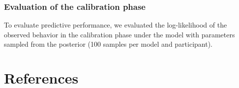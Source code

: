 \documentclass{article}
\begin{document}
\subsubsection{Evaluation of the calibration phase}
To evaluate predictive performance, we evaluated the log-likelihood of the observed behavior in the calibration phase under the model with parameters sampled from the posterior (100 samples per model and participant).

\section*{References}
\printbibliography[heading=none]
\end{document}
